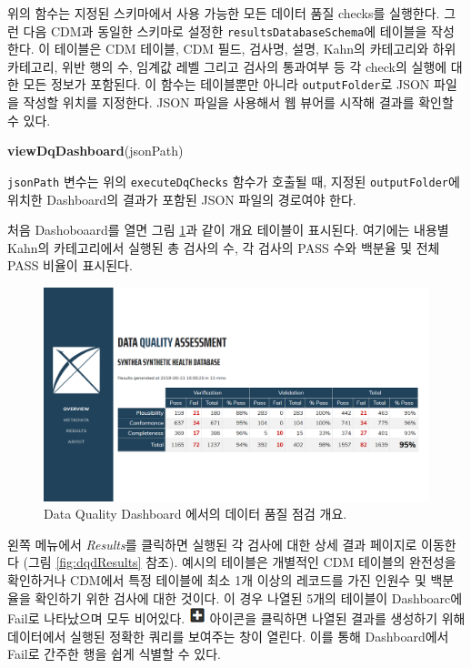 \documentclass[11pt]{book}
\newenvironment{Shaded}{\begin{snugshade}}{\end{snugshade}}
\newcommand{\KeywordTok}[1]{\textcolor[rgb]{0.13,0.29,0.53}{\textbf{#1}}}
\newcommand{\NormalTok}[1]{#1}
\theoremstyle{definition}
\theoremstyle{definition}
\theoremstyle{definition}
\theoremstyle{remark}
\begin{document}
위의 함수는 지정된 스키마에서 사용 가능한 모든 데이터 품질 checks를
실행한다. 그런 다음 CDM과 동일한 스키마로 설정한
\texttt{resultsDatabaseSchema}에 테이블을 작성한다. 이 테이블은 CDM
테이블, CDM 필드, 검사명, 설명, Kahn의 카테고리와 하위 카테고리, 위반
행의 수, 임계값 레벨 그리고 검사의 통과여부 등 각 check의 실행에 대한
모든 정보가 포함된다. 이 함수는 테이블뿐만 아니라
\texttt{outputFolder}로 JSON 파일을 작성할 위치를 지정한다. JSON 파일을
사용해서 웹 뷰어를 시작해 결과를 확인할 수 있다.

\begin{Shaded}
\begin{Highlighting}[]
\KeywordTok{viewDqDashboard}\NormalTok{(jsonPath)}
\end{Highlighting}
\end{Shaded}

\texttt{jsonPath} 변수는 위의 \texttt{executeDqChecks} 함수가 호출될 때,
지정된 \texttt{outputFolder}에 위치한 Dashboard의 결과가 포함된 JSON
파일의 경로여야 한다.

처음 Dashoboaard를 열면 그림 \ref{fig:dqdOverview}과 같이 개요 테이블이
표시된다. 여기에는 내용별 Kahn의 카테고리에서 실행된 총 검사의 수, 각
검사의 PASS 수와 백분율 및 전체 PASS 비율이 표시된다.

\begin{figure}

{\centering \includegraphics[width=1\linewidth]{images/DataQuality/dqdOverview} 

}

\caption{Data Quality Dashboard 에서의 데이터 품질 점검 개요.}\label{fig:dqdOverview}
\end{figure}

왼쪽 메뉴에서 \emph{Results}를 클릭하면 실행된 각 검사에 대한 상세 결과
페이지로 이동한다 (그림 \ref{fig:dqdResults} 참조). 예시의 테이블은
개별적인 CDM 테이블의 완전성을 확인하거나 CDM에서 특정 테이블에 최소 1개
이상의 레코드를 가진 인원수 및 백분율을 확인하기 위한 검사에 대한
것이다. 이 경우 나열된 5개의 테이블이 Dashboarc에 Fail로 나타났으며 모두
비어있다. \includegraphics{images/DataQuality/plusIcon.png} 아이콘을
클릭하면 나열된 결과를 생성하기 위해 데이터에서 실행된 정확한 쿼리를
보여주는 창이 열린다. 이를 통해 Dashboard에서 Fail로 간주한 행을 쉽게
식별할 수 있다.
\end{document}
